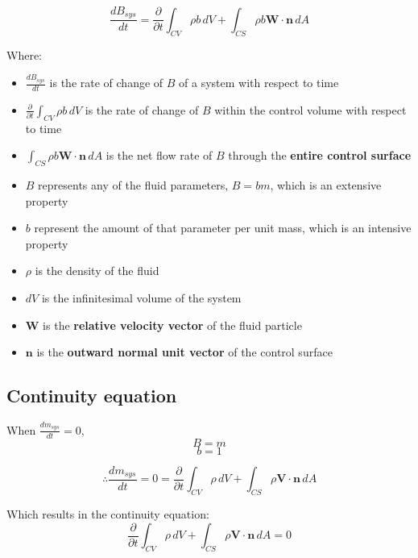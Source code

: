 \documentclass[11pt]{article}
\begin{document}
\[\frac{dB_{sys}}{dt} = \frac{\partial}{\partial t} \int_{CV} \rho b \, dV + \int_{CS} \rho b \boldsymbol{W} \cdot \boldsymbol{n} \, dA\]

Where:
\begin{itemize}
\item \(\frac{dB_{sys}}{dt}\) is the rate of change of \(B\) of a system with respect to time
\item \(\frac{\partial}{\partial t} \int_{CV} \rho b \, dV\) is the rate of change of \(B\) within the control volume with respect to time
\item \(\int_{CS} \rho b \boldsymbol{W} \cdot \boldsymbol{n} \, dA\) is the net flow rate of \(B\) through the \textbf{entire control surface}
\item \(B\) represents any of the fluid parameters, \(B = bm\), which is an extensive property
\item \(b\) represent the amount of that parameter per unit mass, which is an intensive property
\item \(\rho\) is the density of the fluid
\item \(dV\) is the infinitesimal volume of the system
\item \(\boldsymbol{W}\) is the \textbf{relative velocity vector} of the fluid particle
\item \(\boldsymbol{n}\) is the \textbf{outward normal unit vector} of the control surface
\end{itemize}

\newpage
\subsection{Continuity equation}
\label{sec:org810b80f}
When \(\frac{dm_{sys}}{dt} = 0\),
\[B = m\]
\[b = 1\]

\[\therefore \frac{dm_{sys}}{dt} = 0 = \frac{\partial}{\partial t} \int_{CV} \rho \, dV + \int_{CS} \rho \boldsymbol{V} \cdot \boldsymbol{n} \, dA\]

Which results in the continuity equation:
\[\frac{\partial}{\partial t} \int_{CV} \rho \, dV + \int_{CS} \rho \boldsymbol{V} \cdot \boldsymbol{n} \, dA = 0\]
\end{document}
